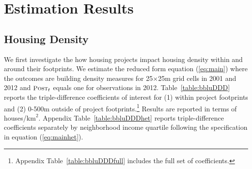 \documentclass[12pt]{article}
\begin{document}




\section{Estimation Results}\label{section:results}




\subsection{Housing Density}\label{section:bbluestimates}

We first investigate the how housing projects impact housing density within and around their footprints.  We estimate the reduced form equation (\ref{eq:main}) where the outcomes are building density measures for 25$\times$25m grid cells in 2001 and 2012 and $\textsc{\small Post}_{t}$ equals one for observations in 2012.  Table~\ref{table:bbluDDD} reports the triple-difference coefficients of interest for (1) within project footprints and (2) 0-500m outside of project footprints.\footnote{Appendix Table~\ref{table:bbluDDDfull} includes the full set of coefficients.}  Results are reported in terms of houses/$\text{km}^{2}$.  Appendix Table~\ref{table:bbluDDDhet} reports triple-difference coefficients separately by neighborhood income quartile following the specification in equation (\ref{eq:mainhet}).  
\end{document}
